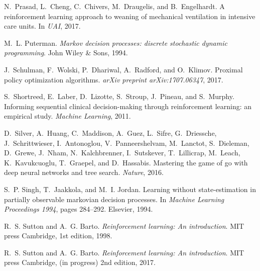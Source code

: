 \documentclass{article}
\begin{document}
\begin{thebibliography}{36}
N.~Prasad, L.~Cheng, C.~Chivers, M.~Draugelis, and B.~Engelhardt.
\newblock A reinforcement learning approach to weaning of mechanical
  ventilation in intensive care units.
\newblock In \emph{UAI}, 2017.

M.~L. Puterman.
\newblock \emph{Markov decision processes: discrete stochastic dynamic
  programming}.
\newblock John Wiley \& Sons, 1994.

J.~Schulman, F.~Wolski, P.~Dhariwal, A.~Radford, and O.~Klimov.
\newblock Proximal policy optimization algorithms.
\newblock \emph{arXiv preprint arXiv:1707.06347}, 2017.

S.~Shortreed, E.~Laber, D.~Lizotte, S.~Stroup, J.~Pineau, and S.~Murphy.
\newblock Informing sequential clinical decision-making through reinforcement
  learning: an empirical study.
\newblock \emph{Machine Learning}, 2011.

D.~Silver, A.~Huang, C.~Maddison, A.~Guez, L.~Sifre, G.~Driessche,
  J.~Schrittwieser, I.~Antonoglou, V.~Panneershelvam, M.~Lanctot, S.~Dieleman,
  D.~Grewe, J.~Nham, N.~Kalchbrenner, I.~Sutskever, T.~Lillicrap, M.~Leach,
  K.~Kavukcuoglu, T.~Graepel, and D.~Hassabis.
\newblock Mastering the game of go with deep neural networks and tree search.
\newblock \emph{Nature}, 2016.

S.~P. Singh, T.~Jaakkola, and M.~I. Jordan.
\newblock Learning without state-estimation in partially observable markovian
  decision processes.
\newblock In \emph{Machine Learning Proceedings 1994}, pages 284--292.
  Elsevier, 1994.

R.~S. Sutton and A.~G. Barto.
\newblock \emph{Reinforcement learning: An introduction}.
\newblock MIT press Cambridge, 1st edition, 1998.

R.~S. Sutton and A.~G. Barto.
\newblock \emph{Reinforcement learning: An introduction}.
\newblock MIT press Cambridge, (in progress) 2nd edition, 2017.


\end{thebibliography}
\end{document}
